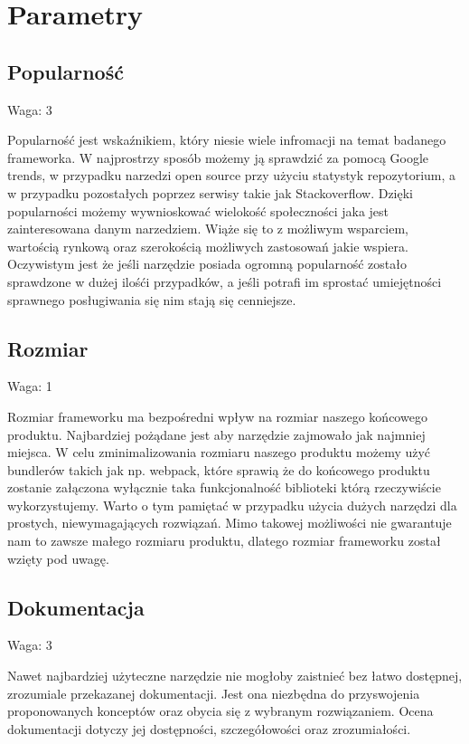 \documentclass[12pt]{report}
\begin{document}
  \section{Parametry}

    \subsection{Popularność}
      \begin{description}
        \item Waga: 3
      \end{description}
      Popularność jest wskaźnikiem, który niesie wiele infromacji na temat badanego frameworka.
      W najprostrzy sposób możemy ją sprawdzić za pomocą Google trends, w przypadku narzedzi open source przy użyciu statystyk repozytorium, a w przypadku pozostałych poprzez serwisy takie jak Stackoverflow.
      Dzięki popularności możemy wywnioskować wielokość społeczności jaka jest zainteresowana danym narzedziem.
      Wiąże się to z możliwym wsparciem, wartością rynkową oraz szerokością możliwych zastosowań jakie wspiera.
      Oczywistym jest że jeśli narzędzie posiada ogromną popularność zostało sprawdzone w dużej ilośći przypadków, a jeśli potrafi im sprostać umiejętności sprawnego posługiwania się nim stają się cenniejsze.

    \subsection{Rozmiar}
      \begin{description}
        \item Waga: 1
      \end{description}
      Rozmiar frameworku ma bezpośredni wpływ na rozmiar naszego końcowego produktu.
      Najbardziej pożądane jest aby narzędzie zajmowało jak najmniej miejsca.
      W celu zminimalizowania rozmiaru naszego produktu możemy użyć bundlerów takich jak np. webpack, które sprawią że do końcowego produktu zostanie załączona wyłącznie taka funkcjonalność biblioteki którą rzeczywiście wykorzystujemy.
      Warto o tym pamiętać w przypadku użycia dużych narzędzi dla prostych, niewymagających rozwiązań.
      Mimo takowej możliwości nie gwarantuje nam to zawsze małego rozmiaru produktu, dlatego rozmiar frameworku został wzięty pod uwagę.

    \subsection{Dokumentacja}
      \begin{description}
        \item Waga: 3
      \end{description}
      Nawet najbardziej użyteczne narzędzie nie mogłoby zaistnieć bez łatwo dostępnej, zrozumiale przekazanej dokumentacji.
      Jest ona niezbędna do przyswojenia proponowanych konceptów oraz obycia się z wybranym rozwiązaniem.
      Ocena dokumentacji dotyczy jej dostępności, szczegółowości oraz zrozumiałości.
\end{document}
